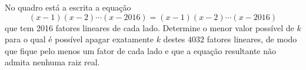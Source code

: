 No quadro está a escrita a equação \[ (x-1)(x-2)\cdots(x-2016) = (x-1)(x-2)\cdots (x-2016)\] que tem 2016 fatores lineares de cada lado. Determine o menor valor possível de $k$ para o qual é possível apagar exatamente $k$ destes $4032$ fatores lineares, de modo que fique pelo menos um fator de cada lado e que a equação resultante não admita nenhuma raiz real.
